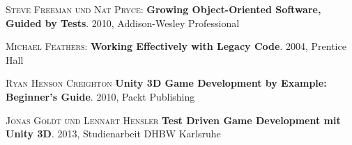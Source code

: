 \begin{thebibliography}{---}

  \textsc{Steve Freeman und Nat Pryce}: 
  \textbf{Growing Object-Oriented Software, Guided by Tests}.
  2010, Addison-Wesley Professional
  
  \textsc{Michael Feathers}: 
  \textbf{Working Effectively with Legacy Code}.
2004, Prentice Hall
    
  \textsc{Ryan Henson Creighton}
  \textbf{Unity 3D Game Development by Example: Beginner's Guide}.
  2010, Packt Publishing
      
  \textsc{Jonas Goldt und Lennart Hensler}
  \textbf{Test Driven Game Development mit Unity 3D}.
  2013, Studienarbeit DHBW Karlsruhe

\end{thebibliography}

